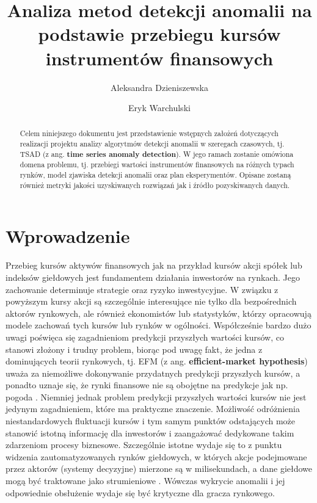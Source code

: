 \documentclass{article}
\title{Analiza metod detekcji anomalii na podstawie przebiegu kursów
instrumentów finansowych}
\author{Aleksandra Dzieniszewska \and Eryk Warchulski}
\date{}
\begin{document}
\maketitle
\begin{abstract}
  Celem niniejszego dokumentu jest przedstawienie wstępnych założeń
  dotyczących realizacji projektu analizy algorytmów detekcji anomalii w
  szeregach czasowych, tj. TSAD (z ang. \textbf{time series anomaly
  detection}). W jego ramach zostanie omówiona domena problemu, tj.
  przebiegi wartości instrumentów finansowych na różnych typach rynków,
  model zjawiska detekcji anomalii oraz plan eksperymentów. Opisane
  zostaną również metryki jakości uzyskiwanych rozwiązań jak i źródło
  pozyskiwanych danych.
\end{abstract}

\section{Wprowadzenie}

  Przebieg kursów aktywów finansowych jak na przykład kursów akcji
  spółek lub indeksów giełdowych jest fundamentem działania inwestorów na
  rynkach. Jego zachowanie determinuje strategie oraz ryzyko inwestycyjne.
  W związku z powyższym  kursy akcji są szczególnie interesujące nie
  tylko dla bezpośrednich aktorów rynkowych, ale również ekonomistów lub
  statystyków, którzy opracowują modele zachowań tych kursów lub rynków w
  ogólności. Współcześnie bardzo dużo uwagi poświęca się zagadnieniom
  predykcji przyszłych wartości kursów, co stanowi złożony i trudny
  problem, biorąc pod uwagę fakt, że jedna z dominujących teorii
  rynkowych, tj. EFM (z ang. \textbf{efficient-market hypothesis}) uważa
  za niemożliwe dokonywanie przydatnych predykcji \cite{RandomWalk}
  przyszłych kursów, a ponadto uznaje się, że rynki finansowe nie są
  obojętne na predykcje jak np. pogoda \cite{Sapiens}. Niemniej jednak
  problem predykcji przyszłych wartości kursów nie jest jedynym
  zagadnieniem, które ma praktyczne znaczenie. Możliwość odróżnienia
  niestandardowych fluktuacji kursów i tym samym punktów odstających może
  stanowić istotną informację dla inwestorów i zaangażować dedykowane
  takim zdarzeniom procesy biznesowe. Szczególnie istotne wydaje się to z
  punktu widzenia zautomatyzowanych rynków giełdowych, w których akcje
  podejmowane przez aktorów (systemy decyzyjne) mierzone są w
  milisekundach, a dane giełdowe mogą być traktowane jako strumieniowe
  \cite{HFT-wiki}. Wówczas wykrycie anomalii i jej odpowiednie obsłużenie
  wydaje się być krytyczne dla gracza rynkowego.
  \newline
  
\end{document}
